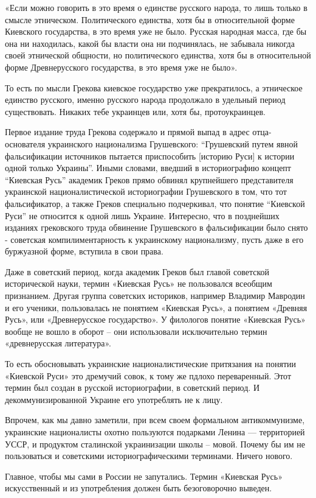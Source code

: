 «Если можно говорить в это время о единстве русского народа, то лишь только в
смысле этническом. Политического единства, хотя бы в относительной форме
Киевского государства, в это время уже не было. Русская народная масса, где бы
она ни находилась, какой бы власти она ни подчинялась, не забывала никогда
своей этнической общности, но политического единства, хотя бы в относительной
форме Древнерусского государства, в это время уже не было».

То есть по мысли Грекова киевское государство уже прекратилось, а этническое
единство русского, именно русского народа продолжало в удельный период
существовать. Никаких тебе украинцев или, хотя бы, протоукраинцев.

Первое издание труда Грекова содержало и прямой выпад в адрес отца-основателя
украинского национализма Грушевского: \enquote{Грушевский путем явной фальсификации
источников пытается приспособить [историю Руси] к истории одной только
Украины}. Иными словами, введший в историографию концепт \enquote{Киевская Русь}
академик Греков прямо обвинял крупнейшего представителя украинской
националистической историографии Грушевского в том, что тот фальсификатор, а
также Греков специально подчеркивал, что понятие \enquote{Киевской Руси} не относится к
одной лишь Украине. Интересно, что в позднейших изданиях грековского труда
обвинение Грушевского в фальсификации было снято - советская компилиментарность
к украинскому национализму, пусть даже в его буржуазной форме, вступила в свои
права.


Даже в советский период, когда академик Греков был главой советской
исторической науки, термин «Киевская Русь» не пользовался всеобщим признанием.
Другая группа советских историков, например Владимир Мавродин и его ученики,
пользовалась не понятием «Киевская Русь», а понятием «Древняя Русь», или
«Древнерусское государство». У филологов понятие «Киевская Русь» вообще не
вошло в оборот – они использовали исключительно термин «древнерусская
литература».

То есть обосновывать украинские националистические притязания на понятии
«Киевской Руси» это дремучий совок, к тому же пдлохо переваренный. Этот термин
был создан в русской историографии, в советский период. И декоммунизированной
Украине его употреблять не к лицу.

Впрочем, как мы давно заметили, при всем своем формальном антикоммунизме,
украинские националисты охотно пользуются подарками Ленина — территорией УССР,
и продуктом сталинской украинизации школы – мовой. Почему бы им не пользоваться
и советскими историографическими терминами. Ничего нового.

Главное, чтобы мы сами в России не запутались. Термин «Киевская Русь»
искусственный и из употребления должен быть безоговорочно выведен.
